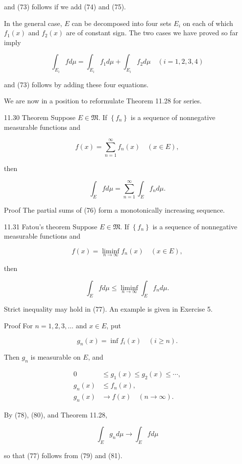 \documentclass[10pt]{article}
\begin{document}
and (73) follows if we add (74) and (75).

In the general case, $E$ can be decomposed into four sets $E_{i}$ on each of which $f_{1}(x)$ and $f_{2}(x)$ are of constant sign. The two cases we have proved so far imply

$$
\int_{E_{i}} f d \mu=\int_{E_{i}} f_{1} d \mu+\int_{E_{i}} f_{2} d \mu \quad(i=1,2,3,4)
$$

and (73) follows by adding these four equations.

We are now in a position to reformulate Theorem 11.28 for series.

11.30 Theorem Suppose $E \in \mathfrak{M}$. If $\left\{f_{n}\right\}$ is a sequence of nonnegative measurable functions and

$$
f(x)=\sum_{n=1}^{\infty} f_{n}(x) \quad(x \in E),
$$

then

$$
\int_{E} f d \mu=\sum_{n=1}^{\infty} \int_{E} f_{n} d \mu .
$$

Proof The partial sums of (76) form a monotonically increasing sequence.

11.31 Fatou's theorem Suppose $E \in \mathfrak{M}$. If $\left\{f_{n}\right\}$ is a sequence of nonnegative measurable functions and

$$
f(x)=\liminf _{n \rightarrow \infty} f_{n}(x) \quad(x \in E),
$$

then

$$
\int_{E} f d \mu \leq \liminf _{n \rightarrow \infty} \int_{E} f_{n} d \mu .
$$

Strict inequality may hold in (77). An example is given in Exercise 5.

Proof For $n=1,2,3, \ldots$ and $x \in E$, put

$$
g_{n}(x)=\inf f_{i}(x) \quad(i \geq n) .
$$

Then $g_{n}$ is measurable on $E$, and

$$
\begin{aligned}
0 & \leq g_{1}(x) \leq g_{2}(x) \leq \cdots, \\
g_{n}(x) & \leq f_{n}(x), \\
g_{n}(x) & \rightarrow f(x) \quad(n \rightarrow \infty) .
\end{aligned}
$$

By (78), (80), and Theorem 11.28,

$$
\int_{E} g_{n} d \mu \rightarrow \int_{E} f d \mu
$$

so that (77) follows from (79) and (81).
\end{document}
